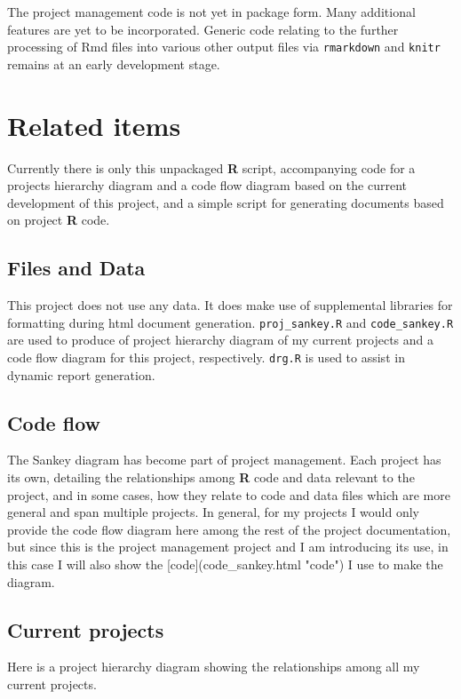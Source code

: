 \documentclass{article}\usepackage[]{graphicx}\usepackage[]{color}
\begin{document}
The project management code is not yet in package form.
Many additional features are yet to be incorporated.
Generic code relating to the further processing of Rmd files into various other output files via \texttt{rmarkdown} and \texttt{knitr} remains at an early development stage.

\section{Related items}
Currently there is only this unpackaged \textbf{R} script, accompanying code for a projects hierarchy diagram
and a code flow diagram based on the current development of this project, and a simple script for generating documents based on project \textbf{R} code.

\subsection{Files and Data}
This project does not use any data.
It does make use of supplemental libraries for formatting during html document generation.
\texttt{proj\_sankey.R} and \texttt{code\_sankey.R} are used to produce of project hierarchy diagram of my current projects and a code flow diagram for this project, respectively.
\texttt{drg.R} is used to assist in dynamic report generation.

\subsection{Code flow}
The Sankey diagram has become part of project management.
Each project has its own, detailing the relationships among \textbf{R} code and data relevant to the project,
and in some cases, how they relate to code and data files which are more general and span multiple projects.
In general, for my projects I would only provide the code flow diagram here among the rest of the project documentation,
but since this is the project management project and I am introducing its use,
in this case I will also show the [code](code\_sankey.html "code") I use to make the diagram.

\subsection{Current projects}
Here is a project hierarchy diagram showing the relationships among all my current projects.
\end{document}
